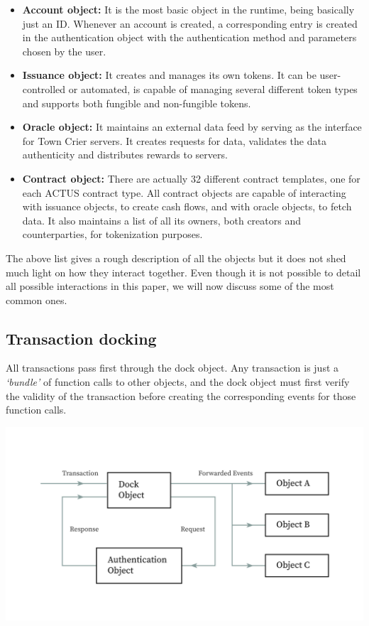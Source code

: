 \documentclass[conference]{IEEEtran}
\begin{document}
\begin{itemize}
	\item \textbf{Account object:} It is the most basic object in the runtime, being basically just an ID. Whenever an account is created, a corresponding entry is created in the authentication object with the authentication method and parameters chosen by the user.
	\item \textbf{Issuance object:} It creates and manages its own tokens. It can be user-controlled or automated, is capable of managing several different token types and supports both fungible and non-fungible tokens.
	\item \textbf{Oracle object:} It maintains an external data feed by serving as the interface for Town Crier servers. It creates requests for data, validates the data authenticity and distributes rewards to servers.
	\item \textbf{Contract object:} There are actually 32 different contract templates, one for each ACTUS contract type. All contract objects are capable of interacting with issuance objects, to create cash flows, and with oracle objects, to fetch data. It also maintains a list of all its owners, both creators and counterparties, for tokenization purposes.
\end{itemize}

The above list gives a rough description of all the objects but it does not shed much light on how they interact together. Even though it is not possible to detail all possible interactions in this paper, we will now discuss some of the most common ones.

\subsection{Transaction docking}
All transactions pass first through the dock object. Any transaction is just a \textit{`bundle'} of function calls to other objects, and the dock object must first verify the validity of the transaction before creating the corresponding events for those function calls.

\includegraphics[width=\linewidth]{images/docking.jpg}
\end{document}
